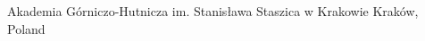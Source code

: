 

\begin{cventries}

  \cventry
    {} %
    {Akademia Górniczo-Hutnicza im. Stanisława Staszica w Krakowie} %
    {Kraków, Poland} %
    {} %
    {}

\end{cventries}
